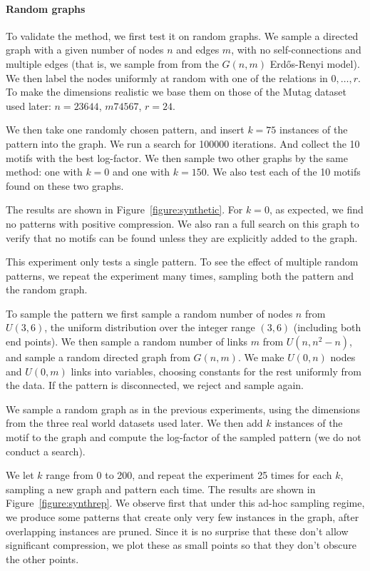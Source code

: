 \documentclass[runningheads]{style/llncs}
\begin{document}
\paragraph{Random graphs} To validate the method, we first test it on random graphs. We sample a directed graph with a given number of nodes $n$ and edges $m$, with no self-connections and multiple edges (that is, we sample from from the $G(n, m)$ Erd\H{o}s-Renyi model). We then label the nodes uniformly at random with one of the relations in $0, \ldots, r$. To make the dimensions realistic we base them on those of the Mutag dataset used later: $n=23644$, $m74567$, $r=24$.

We then take one randomly chosen pattern, and insert $k=75$ instances of the pattern into the graph. We run a search for 100000 iterations. And collect the 10 motifs with the best log-factor. We then sample two other graphs by the same method: one with $k=0$ and one with $k=150$. We also test each of the 10 motifs found on these two graphs.

 The results are shown in Figure~\ref{figure:synthetic}. For $k=0$, as expected, we find no patterns with positive compression. We also ran a full search on this graph to verify that no motifs can be found unless they are explicitly added to the graph. 
 
This experiment only tests a single pattern. To see the effect of multiple random patterns, we repeat the experiment many times, sampling both the pattern and the random graph. 

To sample the pattern we first sample a random number of nodes $n$ from $U(3, 6)$, the uniform distribution over the integer range $(3, 6)$ (including both end points). We then sample a random number of links $m$ from $U(n, n^2 - n)$, and sample a random directed graph from $G(n, m)$. We make $U(0, n)$ nodes and $U(0, m)$ links into variables, choosing constants for the rest uniformly from the data. If the pattern is disconnected, we reject and sample again.

We sample a random graph as in the previous experiments, using the dimensions from the three real world datasets used later. We then add $k$ instances of the motif to the graph and compute the log-factor of the sampled pattern (we do not conduct a search).

We let $k$ range from 0 to 200, and repeat the experiment 25 times for each $k$, sampling a new graph and pattern each time. The results are shown in Figure~\ref{figure:synthrep}. We observe first that under this ad-hoc sampling regime, we produce some patterns that create only very few instances in the graph, after overlapping instances are pruned. Since it is no surprise that these don't allow significant compression, we plot these as small points so that they don't obscure the other points. 
\end{document}
